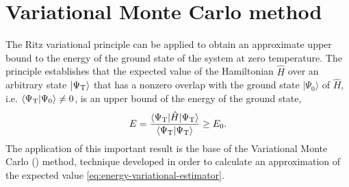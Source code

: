 

\section{Variational Monte Carlo method}

The Ritz variational principle can be applied to obtain an approximate upper
bound to the energy of the ground state of the system at zero temperature. The
principle establishes that the expected value of the Hamiltonian $\hat H$ over
an arbitrary state $\vert \Psi_{\mathrm{T}} \rangle$ that has a nonzero overlap with the
ground state $\vert \Psi_0 \rangle$ of $\hat H$, i.e. $\langle \Psi_{\mathrm{T}} \vert
\Psi_0 \rangle \neq 0$, is an upper bound of the energy of the ground state,
%
\begin{equation}
	\label{eq:energy-variational-estimator}
	E = \frac{\langle \Psi_{\mathrm{T}} \vert {\hat{H}} \vert \Psi_{\mathrm{T}} \rangle}{\langle \Psi_{\mathrm{T}} \vert \Psi_{\mathrm{T}}\rangle} \geq E_0.
\end{equation}
%
The application of this important result is the base of the Variational Monte
Carlo (\VMC) method, technique developed in order to calculate an approximation
of the expected value \eqref{eq:energy-variational-estimator}.

